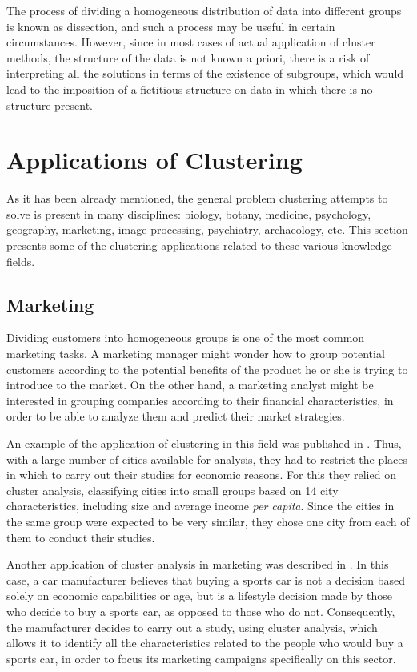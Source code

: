 The process of dividing a homogeneous distribution of data into different groups is known as dissection, and such a process may be useful in certain circumstances. However, since in most cases of actual application of cluster methods, the structure of the data is not known a priori, there is a risk of interpreting all the solutions in terms of the existence of subgroups, which would lead to the imposition of a fictitious structure on data in which there is no structure present.

\section{Applications of Clustering}

As it has been already mentioned, the general problem clustering attempts to solve is present in many disciplines: biology, botany, medicine, psychology, geography, marketing, image processing, psychiatry, archaeology, etc. This section presents some of the clustering applications related to these various knowledge fields.

\subsection{Marketing}

Dividing customers into homogeneous groups is one of the most common marketing tasks. A marketing manager might wonder how to group potential customers according to the potential benefits of the product he or she is trying to introduce to the market. On the other hand, a marketing analyst might be interested in grouping companies according to their financial characteristics, in order to be able to analyze them and predict their market strategies.

An example of the application of clustering in this field was published in \cite{green1967cluster}. Thus, with a large number of cities available for analysis, they had to restrict the places in which to carry out their studies for economic reasons. For this they relied on cluster analysis, classifying cities into small groups based on 14 city characteristics, including size and average income \textit{per capita}. Since the cities in the same group were expected to be very similar, they chose one city from each of them to conduct their studies.

Another application of cluster analysis in marketing was described in \cite{chakrapani2004statistics}. In this case, a car manufacturer believes that buying a sports car is not a decision based solely on economic capabilities or age, but is a lifestyle decision made by those who decide to buy a sports car, as opposed to those who do not. Consequently, the manufacturer decides to carry out a study, using cluster analysis, which allows it to identify all the characteristics related to the people who would buy a sports car, in order to focus its marketing campaigns specifically on this sector.

